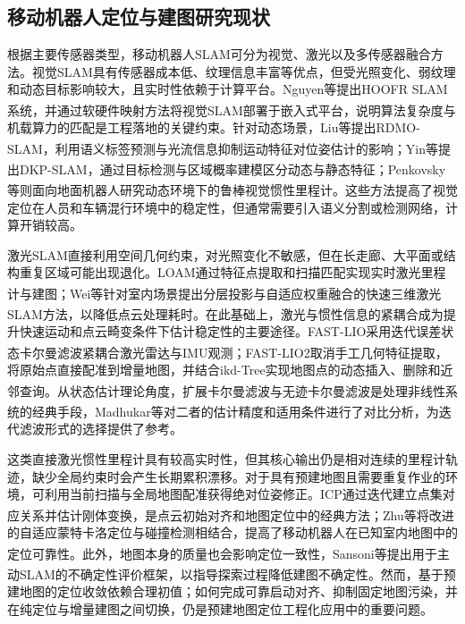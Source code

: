 \subsection{移动机器人定位与建图研究现状}
根据主要传感器类型，移动机器人SLAM可分为视觉、激光以及多传感器融合方法。视觉SLAM具有传感器成本低、纹理信息丰富等优点，但受光照变化、弱纹理和动态目标影响较大，且实时性依赖于计算平台。Nguyen等提出HOOFR SLAM系统，并通过软硬件映射方法将视觉SLAM部署于嵌入式平台\textsuperscript{\cite{8556398}}，说明算法复杂度与机载算力的匹配是工程落地的关键约束。针对动态场景，Liu等提出RDMO-SLAM，利用语义标签预测与光流信息抑制运动特征对位姿估计的影响\textsuperscript{\cite{9497091}}；Yin等提出DKP-SLAM，通过目标检测与区域概率建模区分动态与静态特征\textsuperscript{\cite{YIN20251329}}；Penkovsky等则面向地面机器人研究动态环境下的鲁棒视觉惯性里程计\textsuperscript{\cite{10168408}}。这些方法提高了视觉定位在人员和车辆混行环境中的稳定性，但通常需要引入语义分割或检测网络，计算开销较高。

激光SLAM直接利用空间几何约束，对光照变化不敏感，但在长走廊、大平面或结构重复区域可能出现退化。LOAM通过特征点提取和扫描匹配实现实时激光里程计与建图\textsuperscript{\cite{Zhang2014LOAM}}；Wei等针对室内场景提出分层投影与自适应权重融合的快速三维激光SLAM方法，以降低点云处理耗时\textsuperscript{\cite{10034242}}。在此基础上，激光与惯性信息的紧耦合成为提升快速运动和点云畸变条件下估计稳定性的主要途径。FAST-LIO采用迭代误差状态卡尔曼滤波紧耦合激光雷达与IMU观测\textsuperscript{\cite{Xu2021FASTLIO}}；FAST-LIO2取消手工几何特征提取，将原始点直接配准到增量地图，并结合ikd-Tree实现地图点的动态插入、删除和近邻查询\textsuperscript{\cite{Xu2022FASTLIO2,Cai2021ikdTree}}。从状态估计理论角度，扩展卡尔曼滤波与无迹卡尔曼滤波是处理非线性系统的经典手段，Madhukar等对二者的估计精度和适用条件进行了对比分析\textsuperscript{\cite{9117536}}，为迭代滤波形式的选择提供了参考。

这类直接激光惯性里程计具有较高实时性，但其核心输出仍是相对连续的里程计轨迹，缺少全局约束时会产生长期累积漂移。对于具有预建地图且需要重复作业的环境，可利用当前扫描与全局地图配准获得绝对位姿修正。ICP通过迭代建立点集对应关系并估计刚体变换，是点云初始对齐和地图定位中的经典方法\textsuperscript{\cite{Besl1992ICP}}；Zhu等将改进的自适应蒙特卡洛定位与碰撞检测相结合，提高了移动机器人在已知室内地图中的定位可靠性\textsuperscript{\cite{10528290}}。此外，地图本身的质量也会影响定位一致性，Sansoni等提出用于主动SLAM的不确定性评价框架，以指导探索过程降低建图不确定性\textsuperscript{\cite{SANSONI2025105059}}。然而，基于预建地图的定位收敛依赖合理初值；如何完成可靠启动对齐、抑制固定地图污染，并在纯定位与增量建图之间切换，仍是预建地图定位工程化应用中的重要问题。

